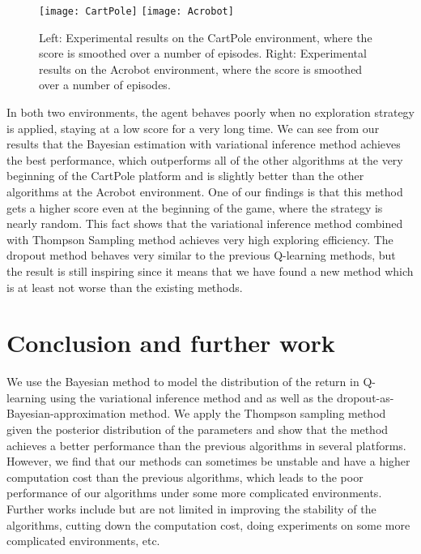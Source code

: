 \documentclass[a4paper,12pt]{article}
\begin{document}
\begin{figure}[htb!]
\center
\texttt{[image: CartPole]}
\texttt{[image: Acrobot]}
\caption{Left: Experimental results on the CartPole environment, where the score is smoothed over a number of episodes.  Right: Experimental results on the Acrobot environment, where the score is smoothed over a number of episodes. }
\end{figure}

In both two environments, the agent behaves poorly when no exploration strategy is applied, staying at a low score for a very long time. We can see from our results that the Bayesian estimation with variational inference method achieves the best performance, which outperforms all of the other algorithms at the very beginning of the CartPole platform and is slightly better than the other algorithms at the Acrobot environment. One of our findings is that this method gets a higher score even at the beginning of the game, where the strategy is nearly random. This fact shows that the variational inference method combined with Thompson Sampling method achieves very high exploring efficiency. The dropout method behaves very similar to the previous Q-learning methods, but the result is still inspiring since it means that we have found a new method which is at least not worse than the existing methods. 

\section{Conclusion and further work}
We use the Bayesian method to model the distribution of the return in Q-learning using the variational inference method and as well as the dropout-as-Bayesian-approximation method. We apply the Thompson sampling method given the posterior distribution of the parameters and show that the method achieves a better performance than the previous algorithms in several platforms. However, we find that our methods can sometimes be unstable and have a higher computation cost than the previous algorithms, which leads to the poor performance of our algorithms under some more complicated environments. Further works include but are not limited in improving the stability of the algorithms, cutting down the computation cost, doing experiments on some more complicated environments, etc.
\end{document}
